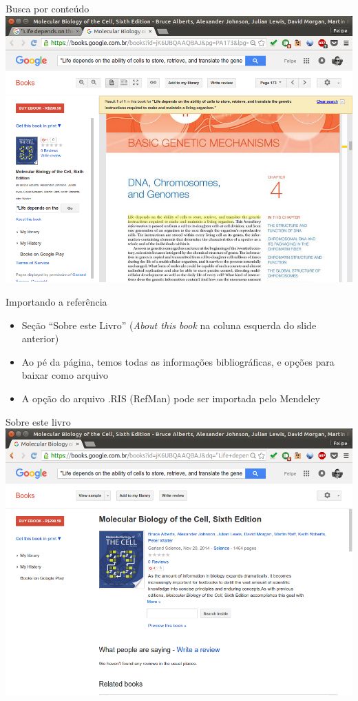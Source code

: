 \documentclass{beamer}
\begin{document}
\begin{frame}{Busca por conteúdo}
  \includegraphics[height=.85\textheight]{Busca/gbooks-busca-conteudo}
\end{frame}

\begin{frame}{Importando a referência}
  \begin{itemize}
  \item Seção ``Sobre este Livro'' ({\em About this book} na coluna
    esquerda do slide anterior)
  \item Ao pé da página, temos todas as informações bibliográficas, e
    opções para baixar como arquivo
  \item A opção do arquivo .RIS (RefMan) pode ser importada pelo
    Mendeley
  \end{itemize}
\end{frame}

\begin{frame}{Sobre este livro}
  \includegraphics[height=.85\textheight]{Busca/gbooks-about1}
\end{frame}
\end{document}
